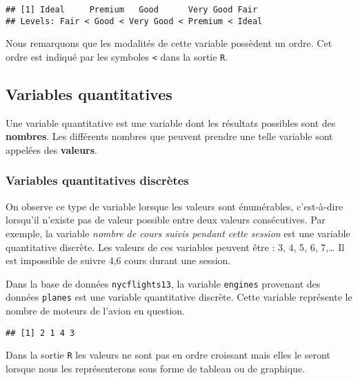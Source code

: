 \documentclass[]{book}
\newenvironment{Shaded}{\begin{snugshade}}{\end{snugshade}}
\newcommand{\KeywordTok}[1]{\textcolor[rgb]{0.13,0.29,0.53}{\textbf{#1}}}
\newcommand{\OperatorTok}[1]{\textcolor[rgb]{0.81,0.36,0.00}{\textbf{#1}}}
\newcommand{\NormalTok}[1]{#1}
\begin{document}
\begin{verbatim}
## [1] Ideal     Premium   Good      Very Good Fair     
## Levels: Fair < Good < Very Good < Premium < Ideal
\end{verbatim}

Nous remarquons que les modalités de cette variable possèdent un ordre.
Cet ordre est indiqué par les symboles \texttt{\textless{}} dans la
sortie \texttt{R}.

\subsection{Variables quantitatives}\label{variables-quantitatives}

Une variable quantitative est une variable dont les résultats possibles
sont des \textbf{nombres}. Les différents nombres que peuvent prendre
une telle variable sont appelées des \textbf{valeurs}.

\subsubsection{Variables quantitatives
discrètes}\label{variables-quantitatives-discretes}

On observe ce type de variable lorsque les valeurs sont énumérables,
c'est-à-dire lorsqu'il n'existe pas de valeur possible entre deux
valeurs consécutives. Par exemple, la variable \emph{nombre de cours
suivis pendant cette session} est une variable quantitative discrète.
Les valeurs de ces variables peuvent être : 3, 4, 5, 6, 7,\ldots{} Il
est impossible de suivre 4,6 cours durant une session.

Dans la base de données \texttt{nycflights13}, la variable
\texttt{engines} provenant des données \texttt{planes} est une variable
quantitative discrète. Cette variable représente le nombre de moteurs de
l'avion en question.

\begin{Shaded}
\end{Shaded}

\begin{verbatim}
## [1] 2 1 4 3
\end{verbatim}

Dans la sortie \texttt{R} les valeurs ne sont pas en ordre croissant
mais elles le seront lorsque nous les représenterons sous forme de
tableau ou de graphique.
\end{document}
